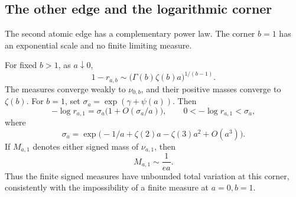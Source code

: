 \subsection{The other edge and the logarithmic corner}

The second atomic edge has a complementary power law. The corner $b=1$
has an exponential scale and no finite limiting measure.

\begin{proposition}
\label{subunit:prop:otheredges}
For fixed $b>1$, as $a\downarrow0$,
\begin{equation}\label{subunit:eq:otheredge}
 1-r_{a,b}\sim\bigl(\Gamma(b)\zeta(b)a\bigr)^{1/(b-1)}.
\end{equation}
The measures converge weakly to $\nu_{0,b}$, and their positive masses
converge to $\zeta(b)$. For $b=1$, set
$\sigma_a=\exp(\gamma+\psi(a))$. Then
\begin{equation}\label{subunit:eq:logcorner}
 -\log r_{a,1}=\sigma_a\bigl(1+O(\sigma_a/a)\bigr),
 \qquad 0<-\log r_{a,1}<\sigma_a,
\end{equation}
where
\[
 \sigma_a=\exp\bigl(-1/a+\zeta(2)a-\zeta(3)a^2+O(a^3)\bigr).
\]
If $M_{a,1}$ denotes either signed mass of $\nu_{a,1}$, then
\begin{equation}\label{subunit:eq:divergingmass}
 M_{a,1}\sim\frac1{e a}.
\end{equation}
Thus the finite signed measures have unbounded total variation at this
corner, consistently with the impossibility of a finite measure at
$a=0,b=1$.
\end{proposition}

